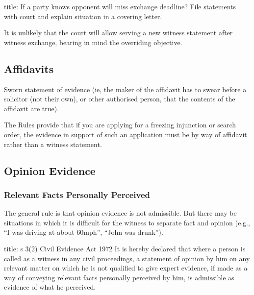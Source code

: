 \documentclass[
]{article}
\newenvironment{Shaded}{}{}
\newcommand{\NormalTok}[1]{#1}
\begin{document}
\begin{Shaded}
\begin{Highlighting}[]
\NormalTok{title: If a party knows opponent will miss exchange deadline?}
\NormalTok{File statements with court and explain situation in a covering letter. }
\end{Highlighting}
\end{Shaded}

It is unlikely that the court will allow serving a new witness statement
after witness exchange, bearing in mind the overriding objective.

\hypertarget{affidavits}{%
\subsection{Affidavits}\label{affidavits}}

\begin{Shaded}
\begin{Highlighting}[]
\NormalTok{Sworn statement of evidence (ie, the maker of the affidavit has to swear before a solicitor (not their own), or other authorised person, that the contents of the affidavit are true).}
\end{Highlighting}
\end{Shaded}

The Rules provide that if you are applying for a freezing injunction or
search order, the evidence in support of such an application must be by
way of affidavit rather than a witness statement.

\hypertarget{opinion-evidence}{%
\subsection{Opinion Evidence}\label{opinion-evidence}}

\hypertarget{relevant-facts-personally-perceived}{%
\subsubsection{Relevant Facts Personally
Perceived}\label{relevant-facts-personally-perceived}}

The general rule is that opinion evidence is not admissible. But there
may be situations in which it is difficult for the witness to separate
fact and opinion (e.g., ``I was driving at about 60mph'', ``John was
drunk'').

\begin{Shaded}
\begin{Highlighting}[]
\NormalTok{title: s 3(2) Civil Evidence Act 1972}
\NormalTok{It is hereby declared that where a person is called as a witness in any civil proceedings, a statement of opinion by him on any relevant matter on which he is not qualified to give expert evidence, if made as a way of conveying relevant facts personally perceived by him, is admissible as evidence of what he perceived.}
\end{Highlighting}
\end{Shaded}
\end{document}
